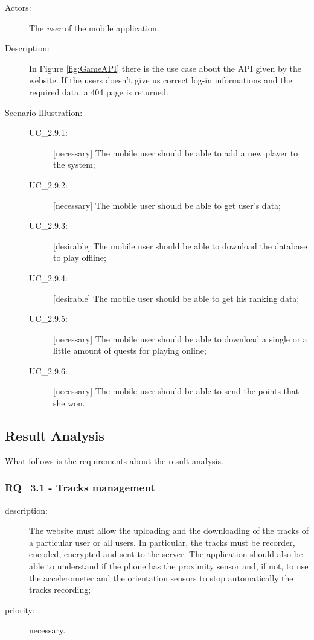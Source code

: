 \begin{description}
	\item[Actors:] The \textit{user} of the mobile application.
	\item[Description:] In Figure \ref{fig:GameAPI} there is the use case about the API given by the website. If the users doesn't give us correct log-in informations and the required data, a 404 page is returned.
	\item[Scenario Illustration:]
\begin{description}
			\item[UC\_2.9.1:] [necessary] The mobile user should be able to add a new player to the system;
			\item[UC\_2.9.2:] [necessary] The mobile user should be able to get user's data;
			\item[UC\_2.9.3:] [desirable] The mobile user should be able to download the database to play offline;
			\item[UC\_2.9.4:] [desirable] The mobile user should be able to get his ranking data;
			\item[UC\_2.9.5:] [necessary] The mobile user should be able to download a single or a little amount of quests for playing online;
			\item[UC\_2.9.6:] [necessary] The mobile user should be able to send the points that she won.
		\end{description}
\end{description}

\subsection{Result Analysis}

What follows is the requirements about the result analysis.

\subsubsection{RQ\_3.1 - Tracks management}

\begin{description}
	\item[description:] The website must allow the uploading and the downloading of the tracks of a particular user or all users. In particular, the tracks must be recorder, encoded, encrypted and sent to the server. The application should also be able to understand if the phone has the proximity sensor and, if not, to use the accelerometer and the orientation sensors to stop automatically the tracks recording;
	\item[priority:] necessary.
\end{description}

